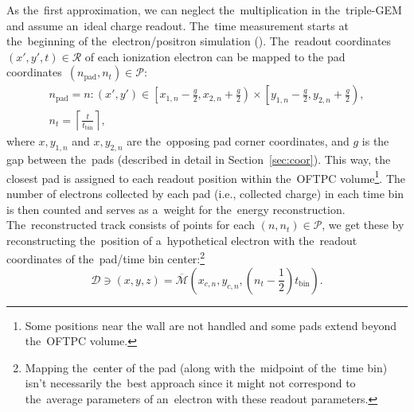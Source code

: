 		As the~first approximation, we can neglect the~multiplication in the~triple\nobreakdash-\ac{GEM} and assume an~ideal charge readout. The~time measurement starts at the~beginning of the~electron/positron simulation ().  The~readout coordinates ${(x',y',t)\in\mathcal{R}}$ of each ionization electron can be mapped to the pad coordinates~$(n_\text{pad},n_t) \in \mathcal{P}$:
			\begin{gather}
				n_\text{pad} = n\colon (x',y') \in \left[x_{1,n}-\frac{g}{2},x_{2,n}+\frac{g}{2}\right)\times\left[y_{1,n}-\frac{g}{2},y_{2,n}+\frac{g}{2}\right),\\
				n_t = \left\lceil \frac{t}{t_\text{bin}}\right\rceil,
			\end{gather}
		where $x,y_{1,n}$ and $x,y_{2,n}$ are the~opposing pad corner coordinates, and $g$ is the gap between the~pads (described in detail in Section~\ref{sec:coor}). This way, the closest pad is assigned to each readout position within the~\ac{OFTPC} volume\footnote{Some positions near the wall are not handled and some pads extend beyond the~\ac{OFTPC} volume. }.  The number of electrons collected by each pad (i.e., collected charge) in each time bin is then counted and serves as a~weight for the~energy reconstruction. The~reconstructed track consists of points for each $(n,n_t)\in\mathcal{P}$, we get these by reconstructing the~position of a~hypothetical electron with the~readout coordinates of the~pad/time bin center:\footnote{Mapping the~center of the pad (along with the~midpoint of the~time bin) isn't necessarily the~best approach since it might not correspond to the~average parameters of an~electron with these readout parameters.}
			\begin{equation}
				\mathcal{D} \ni (x,y,z) = \overbar{\mathcal{M}}\left(x_{c,n},y_{c,n},\left(n_t-\frac{1}{2}\right)t_\text{bin}\right).
			\end{equation}